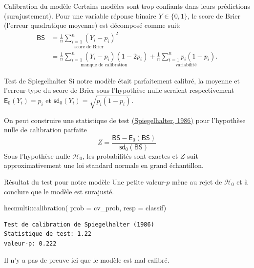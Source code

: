 \documentclass[
  ignorenonframetext,
]{beamer}
\newenvironment{Shaded}{\begin{snugshade}}{\end{snugshade}}
\newcommand{\AttributeTok}[1]{\textcolor[rgb]{0.40,0.45,0.13}{#1}}
\newcommand{\FunctionTok}[1]{\textcolor[rgb]{0.28,0.35,0.67}{#1}}
\newcommand{\NormalTok}[1]{\textcolor[rgb]{0.00,0.23,0.31}{#1}}
\newcommand{\SpecialCharTok}[1]{\textcolor[rgb]{0.37,0.37,0.37}{#1}}
\begin{document}
\begin{frame}{Calibration du modèle}
\label{calibration-du-moduxe8le}
Certains modèles sont trop confiants dans leurs prédictions
(surajustement). Pour une variable réponse binaire \(Y \in \{0,1\}\), le
score de Brier (l'erreur quadratique moyenne) est décomposé comme suit:
\begin{align*}
\mathsf{BS} &= \underset{\text{score de Brier}}{\frac{1}{n} \sum_{i=1}^n (Y_i-p_i)^2}
\\&=\underset{\text{manque de calibration}}{\frac{1}{n} \sum_{i=1}^n(Y_i-p_i)(1-2p_i)} + \underset{\text{variabilité}}{\frac{1}{n} \sum_{i=1}^n p_i(1-p_i)}.
\end{align*}
\end{frame}

\begin{frame}{Test de Spiegelhalter}
\label{test-de-spiegelhalter}
Si notre modèle était parfaitement calibré, la moyenne et l'erreur-type
du score de Brier sous l'hypothèse nulle seraient respectivement
\(\mathsf{E}_0(Y_i)=p_i\) et \(\mathsf{sd}_0(Y_i) = \sqrt{p_i(1-p_i)}\).

On peut construire une statistique de test
\href{https://doi.org/10.1002/sim.4780050506}{(Spiegelhalter, 1986)}
pour l'hypothèse nulle de calibration parfaite
\[Z = \frac{\mathsf{BS}-\mathsf{E}_0(\mathsf{BS})}{\mathsf{sd}_0(\mathsf{BS})}\]
Sous l'hypothèse nulle \(\mathcal{H}_0\), les probabilités sont exactes
et \(Z\) suit approximativement une loi standard normale en grand
échantillon.
\end{frame}

\begin{frame}[fragile]{Résultat du test pour notre modèle}
\label{ruxe9sultat-du-test-pour-notre-moduxe8le}
Une petite valeur-\(p\) mène au rejet de \(\mathcal{H}_0\) et à conclure
que le modèle est surajusté.

\begin{Shaded}
\begin{Highlighting}[numbers=left,,]
\NormalTok{hecmulti}\SpecialCharTok{::}\FunctionTok{calibration}\NormalTok{(}
   \AttributeTok{prob =}\NormalTok{ cv\_prob, }
   \AttributeTok{resp =}\NormalTok{ classif)}
\end{Highlighting}
\end{Shaded}

\begin{verbatim}
Test de calibration de Spiegelhalter (1986)
Statistique de test: 1.22 
valeur-p: 0.222
\end{verbatim}

Il n'y a pas de preuve ici que le modèle est mal calibré.
\end{frame}
\end{document}

